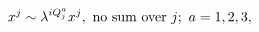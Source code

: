 \begin{equation}
\label{eq:3Q's}
x^j\sim \lambda^{iQ^a_j}x^j,\ {\rm no\ sum\ over}\ j;\ a=1,2,3,
\end{equation}

